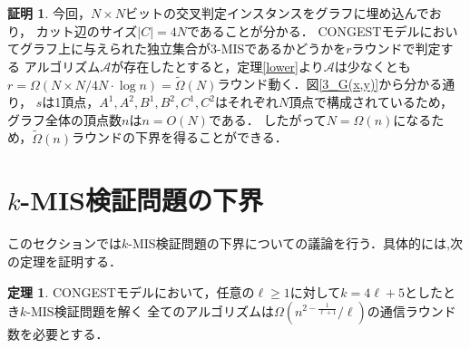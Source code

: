 \documentclass[12pt]{thesis}
\newcommand{\CONGEST}{\textsf{CONGEST}}
\theoremstyle{definition}
\newtheorem{theorem}{定理}[chapter]
\newtheorem*{prf*}{証明}
\begin{document}
\begin{prf*}
今回，$N \times N$ビットの交叉判定インスタンスをグラフに埋め込んでおり，
カット辺のサイズ$|C| = 4N$であることが分かる．
{\CONGEST}モデルにおいてグラフ上に与えられた独立集合が3-MISであるかどうかを$r$ラウンドで判定する
アルゴリズム$\mathcal{A}$が存在したとすると，定理\ref{lower}より$\mathcal{A}$は少なくとも
$r = \Omega (N \times N/ 4N \cdot \log n) = \tilde{\Omega}(N)$ラウンド動く．図\ref{3_G(x,y)}から分かる通り，
$s$は1頂点，$A^{1}, A^{2}, B^{1}, B^{2}, C^{1}, C^{2}$はそれぞれ$N$頂点で構成されているため，
グラフ全体の頂点数$n$は$n = O(N)$である．
したがって$N = \Omega(n)$になるため，$\tilde{\Omega}(n)$ラウンドの下界を得ることができる．
\end{prf*}
\newpage

\section{$k$-MIS検証問題の下界}
このセクションでは$k$-MIS検証問題の下界についての議論を行う．具体的には,次の定理を証明する．
\begin{theorem}
{\CONGEST}モデルにおいて，任意の$\ell \geq 1$に対して$k = 4\ell + 5$としたとき$k$-MIS検証問題を解く
全てのアルゴリズムは$\Omega\left(n^{2 - \frac{1}{\ell+1}}/\ell \right)$の通信ラウンド数を必要とする．
\end{theorem}
\end{document}
